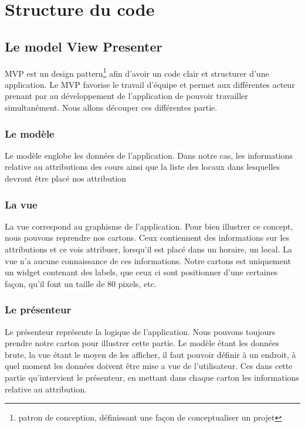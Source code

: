 
\chapter{Structure du code}

\section{Le model View Presenter}
MVP est un design pattern\footnote{patron de conception, définissant une façon de conceptualiser un projet} afin d'avoir un code clair et structurer d'une application. Le MVP favorise le travail d'équipe et permet aux différentes acteur prenant par au développement de l'application de pouvoir travailler simultanément. Nous allons découper ces différentes partie.

\subsection{Le modèle}
Le modèle englobe les données de l'application. Dans notre cas, les informations relative au attributions des cours ainsi que la liste des locaux dans lesquelles devront être placé nos attribution

\subsection{La vue}
La vue correspond au graphisme de l'application. Pour bien illustrer ce concept, nous pouvons reprendre nos cartons. Ceux contiennent des informations sur les attributions et ce vois attribuer, lorsqu'il est placé dans un horaire, un local. La vue n'a aucune connaissance de ces informations. Notre cartons est uniquement un widget contenant des labels, que ceux ci sont positionner d'une certaines façon, qu'il font un taille de 80 pixels, etc. 

\subsection{Le présenteur}
Le présenteur représente la logique de l'application. Nous pouvons toujours prendre notre carton pour illustrer cette partie. Le modèle étant les données brute, la vue étant le moyen de les afficher, il faut pouvoir définir à un endroit, à quel moment les données doivent être mise a vue de l'utilisateur. Ces dans cette partie qu'intervient le présenteur, en mettant dans chaque carton les informations relative au attribution.
 
